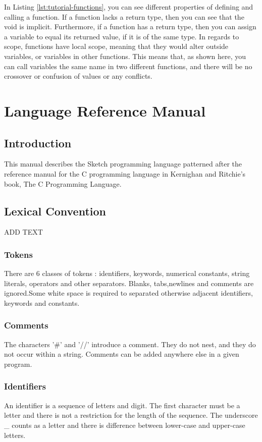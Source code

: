 \documentclass{l3proj}
\begin{document}
In Listing \ref{lst:tutorial-functions}, you can see different properties of defining and calling a function. If a function lacks a return type, then you can see that the void is implicit. Furthermore, if a function has a return type, then you can assign a variable to equal its returned value, if it is of the same type. In regards to scope, functions have local scope, meaning that they would alter outside variables, or variables in other functions. This means that, as shown here, you can call variables the same name in two different functions, and there will be no crossover or confusion of values or any conflicts.


\chapter{Language Reference Manual}
\label{manual}
\section{Introduction}
This manual describes the Sketch programming language patterned after the reference manual for the C programming language in Kernighan and Ritchie’s book, The C Programming Language.

\section{Lexical Convention}
ADD TEXT 
\subsection{Tokens}
There are 6 classes of tokens : identifiers, keywords, numerical constants, string literals, operators and other separators. Blanks, tabs,newlines and comments are ignored.Some white space is required to separated otherwise adjacent identifiers, keywords and constants.  
\subsection{Comments} 
The characters '\#' and '//' introduce a comment. They do not nest, and they do not occur within a string. Comments can be added anywhere else  in a given program. 
\subsection{Identifiers}
\label{ident}
 An identifier is a sequence of letters and digit. The first character must be a letter and there is not a restriction for the length of the sequence. The underscore \_ counts as a letter and there is difference between lower-case and upper-case letters. 
\end{document}
